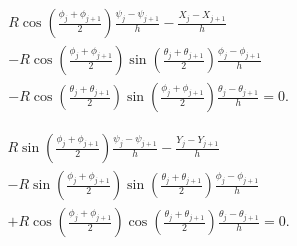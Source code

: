 \documentclass{aims}
\numberwithin{equation}{section}
\theoremstyle{definition}
\begin{document}
\begin{equation}
    \begin{split}
      &R \cos\left(\frac{\phi_j + \phi_{j+1}}{2}\right) \frac{\psi_j - \psi_{j+1}}{h} - 
  \frac{X_j - X_{j+1}}{h}\\
  &- R \cos\left(\frac{\phi_j + \phi_{j+1}}{2}\right) \sin\left(\frac{\theta_j + \theta_{j+1}}{2}\right) \frac{\phi_j - \phi_{j+1}}{h}\\
  &-R \cos\left(\frac{\theta_j + \theta_{j+1}}{2}\right) \sin\left(\frac{\phi_j + \phi_{j+1}}{2}\right) 
  \frac{\theta_j - \theta_{j+1}}{h} = 0.
    \end{split}
\end{equation}

\begin{equation}
    \begin{split}
      &R \sin\left(\frac{\phi_j + \phi_{j+1}}{2}\right) \frac{\psi_j - \psi_{j+1}}{h} - \frac{Y_j - Y_{j+1}}{h}\\ 
      &- R \sin\left(\frac{\phi_j + \phi_{j+1}}{2}\right) \sin\left(\frac{\theta_j + \theta_{j+1}}{2}\right) 
  \frac{\phi_j - \phi_{j+1}}{h}\\
  &+R \cos\left(\frac{\phi_j + \phi_{j+1}}{2}\right) \cos\left(\frac{\theta_j + \theta_{j+1}}{2}\right) \frac{\theta_j - \theta_{j+1}}{h} = 0.
    \end{split}
\end{equation}
\end{document}
